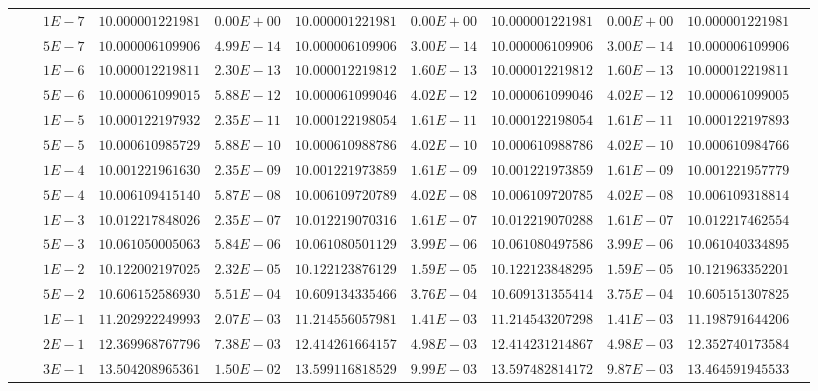 \begin{landscape}
\begin{table}[ht]
{\begin{tabular}[c]{c|c|c|c|c|c|c|c|c|c|c}
& &$1E-7$ & $10.000001221981$ & $0.00E+00$ & $10.000001221981$ & $0.00E+00$ & $10.000001221981$ & $0.00E+00$ & $10.000001221981$ & \\
& &$5E-7$ & $10.000006109906$ & $4.99E-14$ & $10.000006109906$ & $3.00E-14$ & $10.000006109906$ & $3.00E-14$ & $10.000006109906$ & \\
& &$1E-6$ & $10.000012219811$ & $2.30E-13$ & $10.000012219812$ & $1.60E-13$ & $10.000012219812$ & $1.60E-13$ & $10.000012219811$ & \\
& &$5E-6$ & $10.000061099015$ & $5.88E-12$ & $10.000061099046$ & $4.02E-12$ & $10.000061099046$ & $4.02E-12$ & $10.000061099005$ & \\
& &$1E-5$ & $10.000122197932$ & $2.35E-11$ & $10.000122198054$ & $1.61E-11$ & $10.000122198054$ & $1.61E-11$ & $10.000122197893$ & \\
& &$5E-5$ & $10.000610985729$ & $5.88E-10$ & $10.000610988786$ & $4.02E-10$ & $10.000610988786$ & $4.02E-10$ & $10.000610984766$ & \\
& &$1E-4$ & $10.001221961630$ & $2.35E-09$ & $10.001221973859$ & $1.61E-09$ & $10.001221973859$ & $1.61E-09$ & $10.001221957779$ & \\
& &$5E-4$ & $10.006109415140$ & $5.87E-08$ & $10.006109720789$ & $4.02E-08$ & $10.006109720785$ & $4.02E-08$ & $10.006109318814$ & \\
& &$1E-3$ & $10.012217848026$ & $2.35E-07$ & $10.012219070316$ & $1.61E-07$ & $10.012219070288$ & $1.61E-07$ & $10.012217462554$ & \\
& &$5E-3$ & $10.061050005063$ & $5.84E-06$ & $10.061080501129$ & $3.99E-06$ & $10.061080497586$ & $3.99E-06$ & $10.061040334895$ & \\
& &$1E-2$ & $10.122002197025$ & $2.32E-05$ & $10.122123876129$ & $1.59E-05$ & $10.122123848295$ & $1.59E-05$ & $10.121963352201$ & \\
& &$5E-2$ & $10.606152586930$ & $5.51E-04$ & $10.609134335466$ & $3.76E-04$ & $10.609131355414$ & $3.75E-04$ & $10.605151307825$ & \\
& &$1E-1$ & $11.202922249993$ & $2.07E-03$ & $11.214556057981$ & $1.41E-03$ & $11.214543207298$ & $1.41E-03$ & $11.198791644206$ & \\
& &$2E-1$ & $12.369968767796$ & $7.38E-03$ & $12.414261664157$ & $4.98E-03$ & $12.414231214867$ & $4.98E-03$ & $12.352740173584$ & \\
& &$3E-1$ & $13.504208965361$ & $1.50E-02$ & $13.599116818529$ & $9.99E-03$ & $13.597482814172$ & $9.87E-03$ & $13.464591945533$ & \\

\end{tabular}}
\end{table}
\end{landscape}

